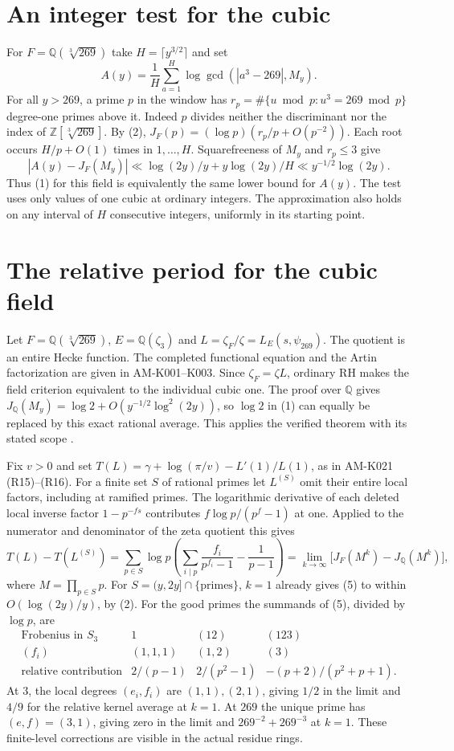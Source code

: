 \documentclass[11pt]{article}
\newcommand{\Q}{\mathbb Q}
\begin{document}
\section*{An integer test for the cubic}
For $F=\Q(\sqrt[3]{269})$ take $H=\lceil y^{3/2}\rceil$ and set
\[
 A(y)=\frac1H\sum_{a=1}^{H}\log\gcd(|a^3-269|,M_y).
\]
For all $y>269$, a prime $p$ in the window has
$r_p=\#\{u\bmod p:u^3=269\bmod p\}$ degree-one primes above it.
Indeed $p$ divides neither the discriminant nor the index of
$\mathbb Z[\sqrt[3]{269}]$. By (2), $J_F(p)=
(\log p)(r_p/p+O(p^{-2}))$. Each root occurs $H/p+O(1)$
times in $1,\ldots,H$. Squarefreeness of $M_y$ and $r_p\le3$ give
\[
 |A(y)-J_F(M_y)|\ll \log(2y)/y+y\log(2y)/H
                    \ll y^{-1/2}\log(2y).
\]
Thus (1) for this field is equivalently the same lower bound for
$A(y)$. The test uses only values of one cubic at ordinary integers.
The approximation also holds on any interval of $H$ consecutive
integers, uniformly in its starting point.

\newpage
\section*{The relative period for the cubic field}
Let $F=\Q(\sqrt[3]{269})$, $E=\Q(\zeta_3)$ and
$L=\zeta_F/\zeta=L_E(s,\psi_{269})$. The quotient is an entire
Hecke function. The completed functional equation and the Artin
factorization are given in AM-K001--K003. Since $\zeta_F=\zeta L$,
ordinary RH makes the field criterion equivalent to the individual
cubic one. The proof over $\Q$ gives $J_{\Q}(M_y)=\log2+
O(y^{-1/2}\log^2(2y))$, so $\log2$ in (1) can equally be replaced
by this exact rational average. This applies the verified theorem
with its stated scope \cite{alpoge}.

Fix $v>0$ and set $T(L)=\gamma+\log(\pi/v)-L'(1)/L(1)$, as in
AM-K021 (R15)--(R16). For a finite set $S$ of rational primes let
$L^{(S)}$ omit their entire local factors, including at ramified primes.
The logarithmic derivative of each deleted local inverse factor
$1-p^{-fs}$ contributes $f\log p/(p^f-1)$ at one. Applied to the
numerator and denominator of the zeta quotient this gives
\[
 T(L)-T(L^{(S)})=
 \sum_{p\in S}\log p\left(\sum_{i\mid p}\frac{f_i}{p^{f_i}-1}
                           -\frac{1}{p-1}\right)
 =\lim_{k\to\infty}\big[J_F(M^k)-J_\Q(M^k)\big],        \tag{5}
\]
where $M=\prod_{p\in S}p$. For $S=(y,2y]\cap\{\text{primes}\}$, $k=1$
already gives (5) to within $O(\log(2y)/y)$, by (2).
For the good primes the summands of (5), divided by $\log p$, are
\[
 \begin{array}{c|ccc}
 \text{Frobenius in }S_3&1&(12)&(123)\\ \hline
 (f_i)&(1,1,1)&(1,2)&(3)\\
 \text{relative contribution}&2/(p-1)&2/(p^2-1)&-(p+2)/(p^2+p+1).
 \end{array}
\]
At $3$, the local degrees $(e_i,f_i)$ are $(1,1),(2,1)$, giving
$1/2$ in the limit and $4/9$ for the relative kernel average at $k=1$.
At $269$ the unique prime has $(e,f)=(3,1)$, giving zero in the limit
and $269^{-2}+269^{-3}$ at $k=1$. These finite-level corrections
are visible in the actual residue rings.
\end{document}

